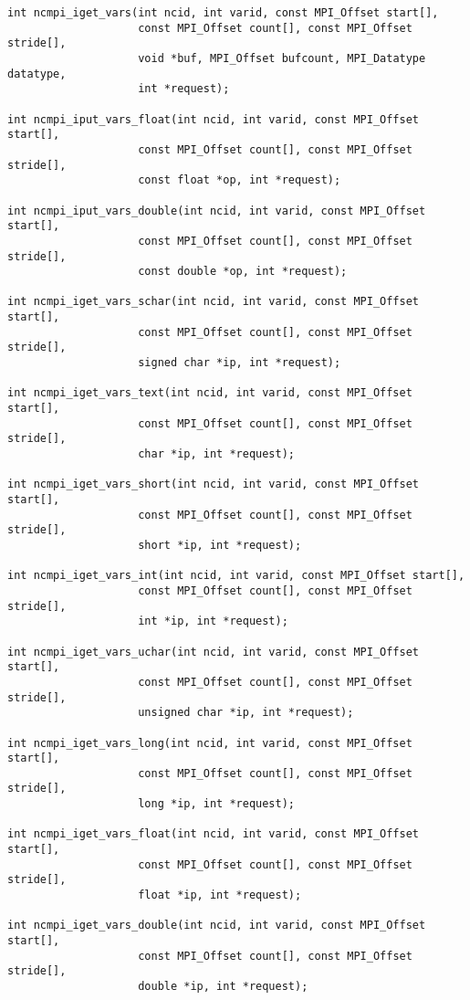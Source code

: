 \begin{verbatim}
int ncmpi_iget_vars(int ncid, int varid, const MPI_Offset start[],
                    const MPI_Offset count[], const MPI_Offset stride[],
                    void *buf, MPI_Offset bufcount, MPI_Datatype datatype,
                    int *request);

int ncmpi_iput_vars_float(int ncid, int varid, const MPI_Offset start[],
                    const MPI_Offset count[], const MPI_Offset stride[],
                    const float *op, int *request);

int ncmpi_iput_vars_double(int ncid, int varid, const MPI_Offset start[],
                    const MPI_Offset count[], const MPI_Offset stride[],
                    const double *op, int *request);

int ncmpi_iget_vars_schar(int ncid, int varid, const MPI_Offset start[],
                    const MPI_Offset count[], const MPI_Offset stride[],
                    signed char *ip, int *request);

int ncmpi_iget_vars_text(int ncid, int varid, const MPI_Offset start[],
                    const MPI_Offset count[], const MPI_Offset stride[],
                    char *ip, int *request);

int ncmpi_iget_vars_short(int ncid, int varid, const MPI_Offset start[],
                    const MPI_Offset count[], const MPI_Offset stride[],
                    short *ip, int *request);

int ncmpi_iget_vars_int(int ncid, int varid, const MPI_Offset start[],
                    const MPI_Offset count[], const MPI_Offset stride[],
                    int *ip, int *request);

int ncmpi_iget_vars_uchar(int ncid, int varid, const MPI_Offset start[],
                    const MPI_Offset count[], const MPI_Offset stride[],
                    unsigned char *ip, int *request);

int ncmpi_iget_vars_long(int ncid, int varid, const MPI_Offset start[],
                    const MPI_Offset count[], const MPI_Offset stride[],
                    long *ip, int *request);

int ncmpi_iget_vars_float(int ncid, int varid, const MPI_Offset start[],
                    const MPI_Offset count[], const MPI_Offset stride[],
                    float *ip, int *request);

int ncmpi_iget_vars_double(int ncid, int varid, const MPI_Offset start[],
                    const MPI_Offset count[], const MPI_Offset stride[],
                    double *ip, int *request);
\end{verbatim}



